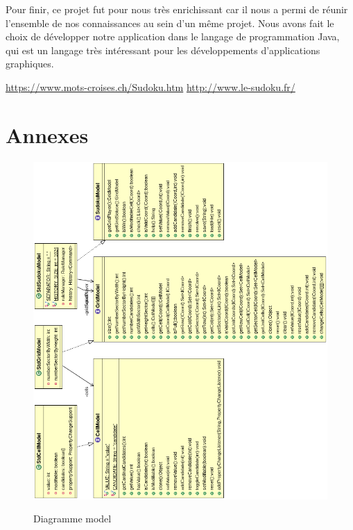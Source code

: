 Pour finir, ce projet fut pour nous très enrichissant car il nous a permi de réunir
l'ensemble de nos connaissances au sein d'un même projet. Nous avons fait le choix 
de développer notre application dans le langage de programmation Java, qui est un langage
très intéressant pour les développements d'applications graphiques.

\begin{thebibliography}{9}
          \url{https://www.mots-croises.ch/Sudoku.htm}
          \url{http://www.le-sudoku.fr/}
\end{thebibliography}

\section{Annexes}
\begin{figure}[ht]
  \caption{\label{annexe16} Diagramme model}
  \includegraphics [width=160mm]{images/model.png} \\[0.5cm]
\end{figure}

